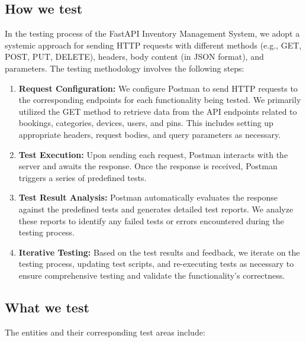 \subsection{How we test}

In the testing process of the FastAPI Inventory Management System, we adopt a systemic approach for sending HTTP requests with different methods (e.g., GET, POST, PUT, DELETE), headers, body content (in JSON format), and parameters. The testing methodology involves the following steps:

\begin{enumerate}
    \item \textbf{Request Configuration:} We configure Postman to send HTTP requests to the corresponding endpoints for each functionality being tested. We primarily utilized the GET method to retrieve data from the API endpoints related to bookings, categories, devices, users, and pins. This includes setting up appropriate headers, request bodies, and query parameters as necessary.

    \item \textbf{Test Execution:} Upon sending each request, Postman interacts with the server and awaits the response. Once the response is received, Postman triggers a series of predefined tests.

    \item \textbf{Test Result Analysis:} Postman automatically evaluates the response against the predefined tests and generates detailed test reports. We analyze these reports to identify any failed tests or errors encountered during the testing process.

    \item \textbf{Iterative Testing:} Based on the test results and feedback, we iterate on the testing process, updating test scripts, and re-executing tests as necessary to ensure comprehensive testing and validate the functionality’s correctness.
\end{enumerate}

\subsection{What we test}

The entities and their corresponding test areas include:


